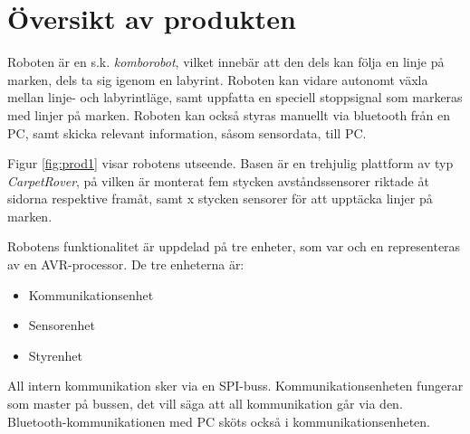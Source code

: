 
%
%
 
\section{Översikt av produkten}

Roboten är en s.k. \emph{komborobot}, vilket innebär att den dels kan följa en linje på marken, dels ta sig igenom en labyrint. Roboten kan vidare autonomt växla mellan linje- och labyrintläge, samt uppfatta en speciell stoppsignal som markeras med linjer på marken. Roboten kan också styras manuellt via bluetooth från en PC, samt skicka relevant information, såsom sensordata, till PC. 

Figur \ref{fig:prod1} visar robotens utseende. Basen är en trehjulig plattform av typ \emph{CarpetRover}, på vilken är monterat fem stycken avståndssensorer riktade åt sidorna respektive framåt, samt x stycken sensorer för att upptäcka linjer på marken. 


Robotens funktionalitet är uppdelad på tre enheter, som var och en representeras av en AVR-processor. De tre enheterna är: 
\begin{itemize}
        \item Kommunikationsenhet
        \item Sensorenhet
        \item Styrenhet
\end{itemize}

All intern kommunikation sker via en SPI-buss. Kommunikationsenheten fungerar som master på bussen, det vill säga att all kommunikation går via den. Bluetooth-kommunikationen med PC sköts också i kommunikationsenheten.